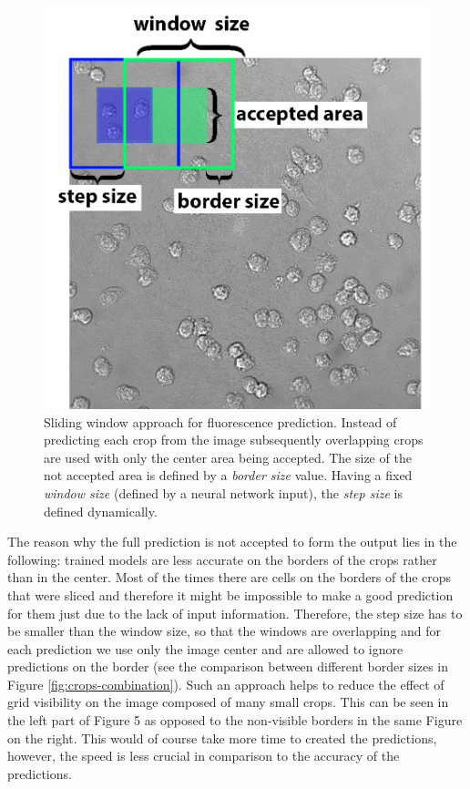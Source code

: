 \begin{figure}[htb]
	\begin{center}
		\includegraphics[width=0.4\linewidth]{bilder/sliding-window.png}
		\caption[Sliding window approach for fluorescence prediction]%
		{Sliding window approach for fluorescence prediction. Instead of predicting each crop from the image subsequently overlapping crops are used with only the center area being accepted. The size of the not accepted area is defined by a \textit{border size} value. Having a fixed \textit{window size} (defined by a neural network input), the \textit{step size} is defined dynamically.}\label{fig:sliding-window}
	\end{center}
\end{figure}
The reason why the full prediction is not accepted to form the output lies in the following: trained models are less accurate on the borders of the crops rather than in the center. Most of the times there are cells on the borders of the crops that were sliced and therefore it might be impossible to make a good prediction for them just due to the lack of input information. Therefore, the step size has to be smaller than the window size, so that the windows are overlapping and for each prediction we use only the image center and are allowed to ignore predictions on the border (see the comparison between different border sizes in Figure \ref{fig:crops-combination}). Such an approach helps to reduce the effect of grid visibility on the image composed of many small crops. This can be seen in the left part of Figure 5 as opposed to the non-visible borders in the same Figure on the right. This would of course take more time to created the predictions, however, the speed is less crucial in comparison to the accuracy of the predictions.

